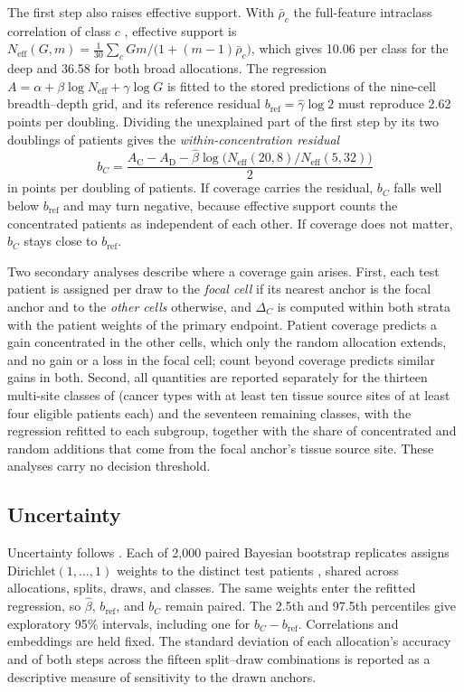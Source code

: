 \documentclass[11pt]{article}
\newcommand{\Neff}{N_{\mathrm{eff}}}
\begin{document}
The first step also raises effective support. With $\bar\rho_c$ the full-feature intraclass correlation of class $c$ \citep{queisler2026multidirectionalRedundancy}, effective support is $\Neff(G,m)=\frac{1}{30}\sum_{c}Gm/\bigl(1+(m-1)\bar\rho_c\bigr)$, which gives 10.06 per class for the deep and 36.58 for both broad allocations. The regression $A=\alpha+\beta\log\Neff+\gamma\log G$ is fitted to the stored predictions of the nine-cell breadth--depth grid, and its reference residual $b_{\mathrm{ref}}=\hat\gamma\log 2$ must reproduce 2.62 points per doubling. Dividing the unexplained part of the first step by its two doublings of patients gives the \emph{within-concentration residual}
\begin{equation}
 b_C=\frac{A_{\mathrm C}-A_{\mathrm D}-\hat\beta\log\bigl(\Neff(20,8)/\Neff(5,32)\bigr)}{2}
 \label{eq:within-concentration}
\end{equation}
\noindent in points per doubling of patients. If coverage carries the residual, $b_C$ falls well below $b_{\mathrm{ref}}$ and may turn negative, because effective support counts the concentrated patients as independent of each other. If coverage does not matter, $b_C$ stays close to $b_{\mathrm{ref}}$.

Two secondary analyses describe where a coverage gain arises. First, each test patient is assigned per draw to the \emph{focal cell} if its nearest anchor is the focal anchor and to the \emph{other cells} otherwise, and $\Delta_C$ is computed within both strata with the patient weights of the primary endpoint. Patient coverage predicts a gain concentrated in the other cells, which only the random allocation extends, and no gain or a loss in the focal cell; count beyond coverage predicts similar gains in both. Second, all quantities are reported separately for the thirteen multi-site classes of \citet{queisler2026siteCoverage} (cancer types with at least ten tissue source sites of at least four eligible patients each) and the seventeen remaining classes, with the regression refitted to each subgroup, together with the share of concentrated and random additions that come from the focal anchor's tissue source site. These analyses carry no decision threshold.

\subsection{Uncertainty}
\label{sec:uncertainty}
Uncertainty follows \citet{queisler2026effectiveSupport}. Each of 2,000 paired Bayesian bootstrap replicates assigns $\mathrm{Dirichlet}(1,\ldots,1)$ weights to the distinct test patients \citep{rubin1981bayesian}, shared across allocations, splits, draws, and classes. The same weights enter the refitted regression, so $\hat\beta$, $b_{\mathrm{ref}}$, and $b_C$ remain paired. The 2.5th and 97.5th percentiles give exploratory 95\% intervals, including one for $b_C-b_{\mathrm{ref}}$. Correlations and embeddings are held fixed. The standard deviation of each allocation's accuracy and of both steps across the fifteen split--draw combinations is reported as a descriptive measure of sensitivity to the drawn anchors.
\end{document}
